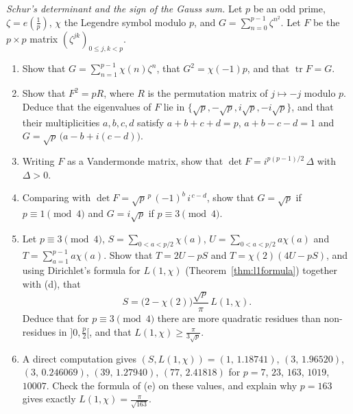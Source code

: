 \begin{exercise}[$\star\star\star$]\label{pb:schur}
\emph{Schur's determinant and the sign of the Gauss sum.} Let $p$ be an odd prime, $\zeta=e(\frac1p)$, $\chi$ the Legendre symbol modulo $p$, and
$G=\sum_{n=0}^{p-1}\zeta^{n^2}$. Let $F$ be the $p\times p$ matrix $(\zeta^{jk})_{0\le j,k<p}$.
\begin{enumerate}[label=(\alph*)]
\item Show that $G=\sum_{n=1}^{p-1}\chi(n)\zeta^n$, that $G^2=\chi(-1)p$, and that $\operatorname{tr}F=G$.
\item Show that $F^2=pR$, where $R$ is the permutation matrix of $j\mapsto-j$ modulo $p$. Deduce that the eigenvalues of $F$ lie in $\{\sqrt p,-\sqrt p,i\sqrt p,-i\sqrt p\}$,
and that their multiplicities $a,b,c,d$ satisfy $a+b+c+d=p$, $a+b-c-d=1$ and $G=\sqrt p\,\bigl(a-b+i(c-d)\bigr)$.
\item Writing $F$ as a Vandermonde matrix, show that $\det F=i^{p(p-1)/2}\,\Delta$ with $\Delta>0$.
\item Comparing with $\det F=\sqrt p^{\,p}\,(-1)^b\,i^{\,c-d}$, show that $G=\sqrt p$ if $p\equiv1\pmod4$ and $G=i\sqrt p$ if $p\equiv3\pmod4$.
\item Let $p\equiv3\pmod4$, $S=\sum_{0<a<p/2}\chi(a)$, $U=\sum_{0<a<p/2}a\chi(a)$ and $T=\sum_{a=1}^{p-1}a\chi(a)$. Show that $T=2U-pS$ and $T=\chi(2)(4U-pS)$, and
using Dirichlet's formula for $L(1,\chi)$ (Theorem~\ref{thm:l1formula}) together with (d), that
\[
S=\bigl(2-\chi(2)\bigr)\frac{\sqrt p}\pi\,L(1,\chi).
\]
Deduce that for $p\equiv3\pmod4$ there are more quadratic residues than non-residues in $]0,\frac p2[$, and that $L(1,\chi)\ge\frac\pi{3\sqrt p}$.
\item A direct computation gives $(S,L(1,\chi))=(1,\,1.18741)$, $(3,\,1.96520)$, $(3,\,0.246069)$, $(39,\,1.27940)$, $(77,\,2.41818)$ for $p=7$, $23$, $163$, $1019$, $10007$.
Check the formula of (e) on these values, and explain why $p=163$ gives exactly $L(1,\chi)=\frac\pi{\sqrt{163}}$.
\end{enumerate}
\end{exercise}

